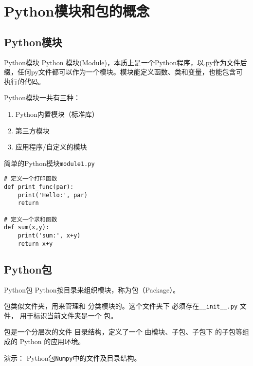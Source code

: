 \documentclass[t]{beamer}
\begin{document}
\section{Python模块和包的概念}
\subsection{Python模块}

\begin{frame}{Python模块}
    Python 模块(Module)，本质上是一个Python程序，以.py作为文件后缀，任何py文件都可以作为一个模块。模块能定义函数、类和变量，也能包含可执行的代码。
    
    Python模块一共有三种：
\begin{enumerate}
    \item Python内置模块（标准库）
    \item 第三方模块
    \item 应用程序/自定义的模块
\end{enumerate}
\end{frame}

\begin{frame}[fragile]{简单的Python模块\texttt{module1.py}}
\begin{lstlisting}
# 定义一个打印函数
def print_func(par):
    print('Hello:', par)
    return

# 定义一个求和函数
def sum(x,y):
    print('sum:', x+y)
    return x+y
\end{lstlisting}


\end{frame}

\subsection{Python包}
\begin{frame}[fragile]{Python包}
    Python按目录来组织模块，称为包（Package）。

    包类似文件夹，用来管理和
    分类模块的。这个文件夹下
    必须存在\verb|__init__.py| 文件，
    用于标识当前文件夹是一个
    包。    

包是一个分层次的文件
目录结构，定义了一个
由模块、子包、子包下
的子包等组成的
Python 的应用环境。

\begin{block}{演示：}
    Python包\texttt{Numpy}中的文件及目录结构。
\end{block}
\end{frame}
\end{document}
